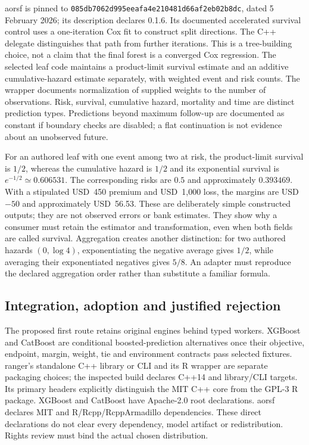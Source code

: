 aorsf is pinned to
\texttt{085db7062d995eeafa4e210481d66af2eb02b8dc}, dated 5 February
2026; its description declares 0.1.6. Its documented accelerated survival
control uses a one-iteration Cox fit to construct split directions. The C++
delegate distinguishes that path from further iterations. This is a tree-building
choice, not a claim that the final forest is a converged Cox regression.
The selected leaf code maintains a product-limit survival estimate and an
additive cumulative-hazard estimate separately, with weighted event and risk
counts. The wrapper documents normalization of supplied weights to the number
of observations. Risk, survival, cumulative hazard, mortality and time are
distinct prediction types. Predictions beyond maximum follow-up are documented
as constant if boundary checks are disabled; a flat continuation is not evidence
about an unobserved future.~\citep{exec24_longcxx_aorsf}

For an authored leaf with one event among two at risk, the product-limit
survival is $1/2$, whereas the cumulative hazard is $1/2$ and its exponential
survival is $e^{-1/2}\simeq0.606531$. The corresponding risks are $0.5$ and
approximately $0.393469$. With a stipulated USD~450 premium and USD~1,000 loss,
the margins are USD~$-50$ and approximately USD~56.53. These are deliberately
simple constructed outputs; they are not observed errors or bank estimates.
They show why a consumer must retain the estimator and transformation, even
when both fields are called survival. Aggregation creates another distinction:
for two authored hazards $(0,\log4)$, exponentiating the negative average gives
$1/2$, while averaging their exponentiated negatives gives $5/8$. An adapter
must reproduce the declared aggregation order rather than substitute a familiar
formula.~\citep{exec24_longcxx_reference}

\subsection{Integration, adoption and justified rejection}

The proposed first route retains original engines behind typed workers. XGBoost
and CatBoost are conditional boosted-prediction alternatives once their objective,
endpoint, margin, weight, tie and environment contracts pass selected fixtures.
ranger's standalone C++ library or CLI and its R wrapper are separate packaging
choices; the inspected build declares C++14 and library/CLI targets. Its primary
headers explicitly distinguish the MIT C++ core from the GPL-3 R package.
XGBoost and CatBoost have Apache-2.0 root declarations. aorsf declares MIT and
R/Rcpp/RcppArmadillo dependencies. These direct declarations do not clear every
dependency, model artifact or redistribution. Rights review must bind the actual
chosen distribution.~\citep{exec24_longcxx_xgboost,exec24_longcxx_catboost,exec24_longcxx_ranger,exec24_longcxx_aorsf}

